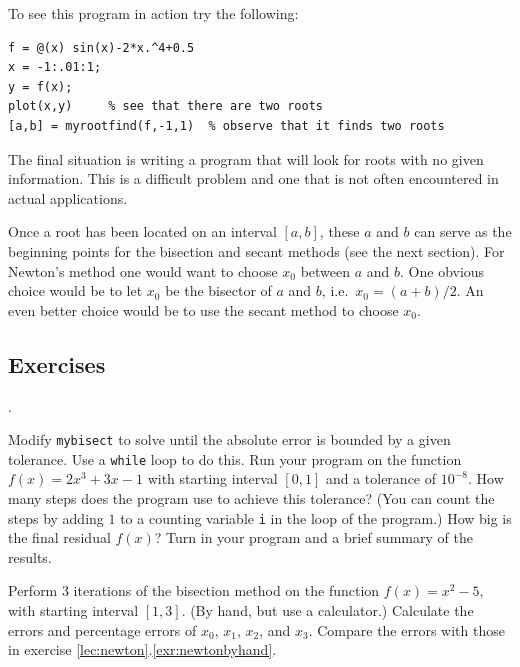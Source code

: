 To see this program in action try the following:
\begin{lstlisting}
f = @(x) sin(x)-2*x.^4+0.5
x = -1:.01:1;
y = f(x);
plot(x,y)     % see that there are two roots
[a,b] = myrootfind(f,-1,1)  % observe that it finds two roots
\end{lstlisting}

The final situation is writing a program that will look
for roots with no given information. This is a difficult
problem and one that is not often encountered in actual 
applications.

Once a root has been located on an interval $[a,b]$,
these $a$ and $b$ can serve as the beginning points
for the bisection and secant methods (see the next section).
For Newton's method one would want to choose $x_0$ between $a$ and
$b$. One obvious choice would be to let $x_0$
be the bisector of $a$ and $b$, i.e.~$x_0 = (a+b)/2$.
An even better choice would be to use the secant method
to choose $x_0$.

\subsection*{Exercises}

\begin{list}
{.}{}

\item Modify \verb&mybisect& to solve until the absolute
      error is bounded by a given tolerance. Use a \verb&while& loop to
      do this. 
	Run your
      program on the function $f(x) = 2x^3 + 3x -1$
      with starting interval $[0,1]$ and a tolerance
      of $10^{-8}$. How many steps
      does the program use to achieve this tolerance?
      (You can count the steps by adding $1$ to a counting
      variable \verb&i& in the loop of the program.)
      How big is the final residual $f(x)$?
      Turn in your program and a brief summary of the results.
      \label{exr:bisectionprogram}

\item Perform 3 iterations of the bisection method
      on the function $f(x) = x^2-5$, with starting
      interval $[1,3]$. (By hand, but use a calculator.)
      Calculate the errors and percentage errors of
      $x_0$, $x_1$, $x_2$, and $x_3$. Compare the errors
      with those in exercise \ref{lec:newton}.\ref{exr:newtonbyhand}.
      \label{exr:bisectionbyhand}
\end{list}



